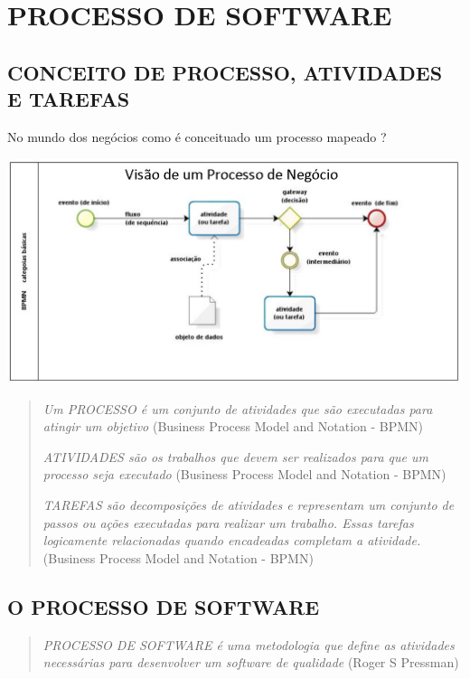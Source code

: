 \documentclass[
]{book}
\begin{document}
\chapter{PROCESSO DE SOFTWARE}\label{processo-de-software}

\section{CONCEITO DE PROCESSO, ATIVIDADES E TAREFAS}\label{conceito-de-processo-atividades-e-tarefas}

No mundo dos negócios como é conceituado um processo mapeado ?

\includegraphics{images/processos/ProcessosNegocio.jpg}

\begin{quote}
\emph{Um PROCESSO é um conjunto de atividades que são executadas para atingir um objetivo} (Business Process Model and Notation - BPMN)

\emph{ATIVIDADES são os trabalhos que devem ser realizados para que um processo seja executado} (Business Process Model and Notation - BPMN)

\emph{TAREFAS são decomposições de atividades e representam um conjunto de passos ou ações executadas para realizar um trabalho. Essas tarefas logicamente relacionadas quando encadeadas completam a atividade.} (Business Process Model and Notation - BPMN)
\end{quote}

\section{O PROCESSO DE SOFTWARE}\label{o-processo-de-software}

\begin{quote}
\emph{PROCESSO DE SOFTWARE é uma metodologia que define as atividades necessárias para desenvolver um software de qualidade} (Roger S Pressman)
\end{quote}
\end{document}
